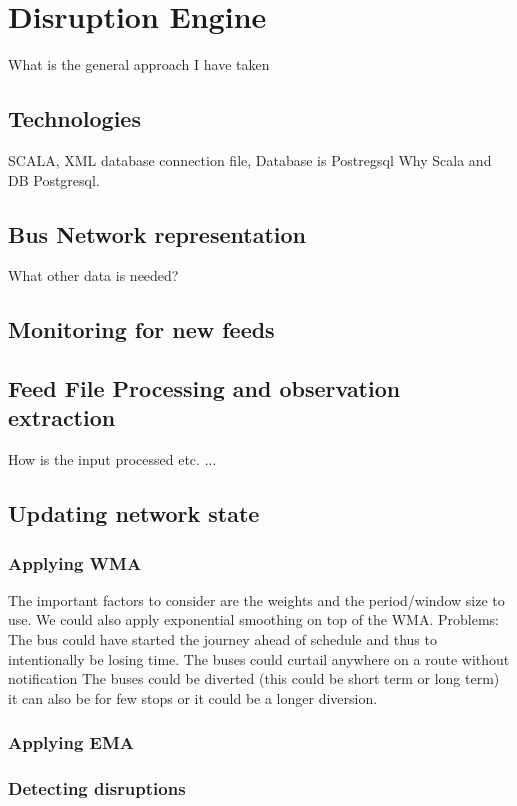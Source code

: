 \section{Disruption Engine}
What is the general approach I have taken
	\subsection{Technologies}
	SCALA, XML database connection file, Database is Postregsql
	Why Scala and DB Postgresql.
	\subsection{Bus Network representation}
	What other data is needed?
	\subsection{Monitoring for new feeds}
	
	\subsection{Feed File Processing and observation extraction}
	How is the input processed etc. ...
	
	\subsection{Updating network state}
	
		\subsubsection{Applying WMA}
	The important factors to consider are the weights and the period/window size to use. We could also apply exponential smoothing on top of the WMA.
	Problems:
The bus could have started the journey ahead of schedule and thus to intentionally be losing time.
The buses could curtail anywhere on a route without notification
The buses could be diverted (this could be short term or long term) it can also be for few stops or it could be a longer diversion.

		\subsubsection{Applying EMA}
		
		\subsubsection{Detecting disruptions}
	
